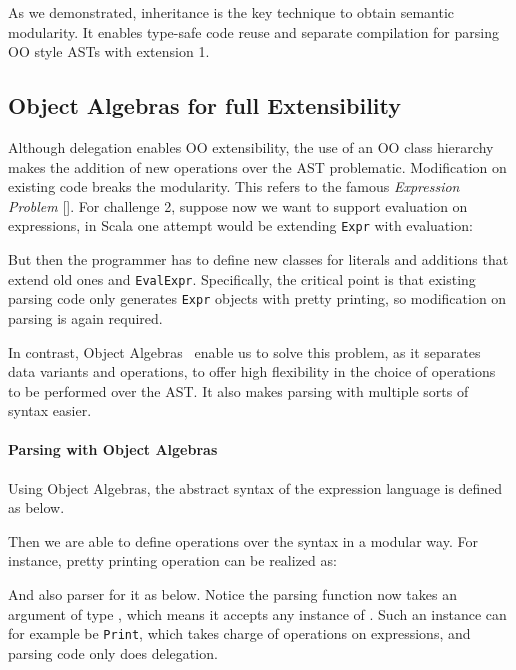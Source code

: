 As we demonstrated, inheritance is the key technique to obtain semantic modularity.
It enables type-safe code reuse and separate compilation for parsing OO style ASTs with extension 1.

\subsection{Object Algebras for full Extensibility}\label{subsec:overview-oa}

Although delegation enables OO extensibility, the use of an OO class
hierarchy makes the addition of new operations over the AST
problematic. Modification on existing code breaks the modularity. This
refers to the famous \textit{Expression Problem} []. For challenge 2, suppose now we want to
support evaluation on expressions, in Scala one attempt would be extending \lstinline{Expr} with
evaluation:

But then the programmer has to define new classes for literals and additions that extend old ones and \lstinline{EvalExpr}. Specifically,
the critical point is that existing parsing code only generates \lstinline{Expr} objects with pretty printing, so modification on parsing is again required.


In contrast, Object Algebras~\cite{Oliveira2012} enable us to solve this problem, as it separates data variants and
operations, to
offer high flexibility in the choice of operations to be performed
over the AST. It also makes parsing with multiple sorts of syntax easier.

\paragraph{Parsing with Object Algebras} Using Object Algebras, the abstract syntax of the expression language is defined as below.


Then we are able to define operations over the syntax in a modular way. For instance, pretty printing operation can be realized as:


And also parser for it as below. Notice the parsing function  now takes an argument of type , which means it accepts any instance of . Such an instance can for example be \lstinline{Print}, which takes charge of operations on expressions, and parsing code only does delegation.

